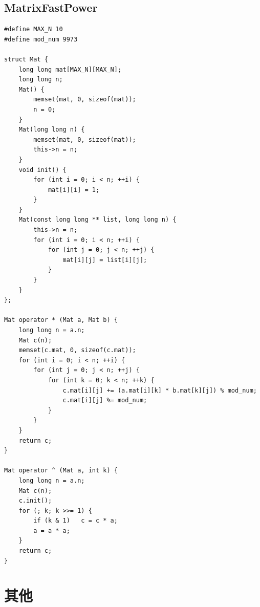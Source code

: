 \documentclass[twoside]{article}
\begin{document}
\subsection{MatrixFastPower}
\begin{lstlisting}
#define MAX_N 10
#define mod_num 9973

struct Mat {
	long long mat[MAX_N][MAX_N];
	long long n;
	Mat() {
		memset(mat, 0, sizeof(mat));
		n = 0;
	}
	Mat(long long n) {
		memset(mat, 0, sizeof(mat));
		this->n = n;
	}
	void init() {
		for (int i = 0; i < n; ++i) {
			mat[i][i] = 1;
		}
	}
	Mat(const long long ** list, long long n) {
		this->n = n;
		for (int i = 0; i < n; ++i) {
			for (int j = 0; j < n; ++j) {
				mat[i][j] = list[i][j];
			}
		}
	}
};

Mat operator * (Mat a, Mat b) {
	long long n = a.n;
	Mat c(n);
	memset(c.mat, 0, sizeof(c.mat));
	for (int i = 0; i < n; ++i) {
		for (int j = 0; j < n; ++j) {
			for (int k = 0; k < n; ++k) {
				c.mat[i][j] += (a.mat[i][k] * b.mat[k][j]) % mod_num;
				c.mat[i][j] %= mod_num;
			}
		}
	}
	return c;
}

Mat operator ^ (Mat a, int k) {
	long long n = a.n;
	Mat c(n);
	c.init();
	for (; k; k >>= 1) {
		if (k & 1)   c = c * a;
		a = a * a;
	}
	return c;
}\end{lstlisting}
\clearpage\section{其他}
\end{document}
